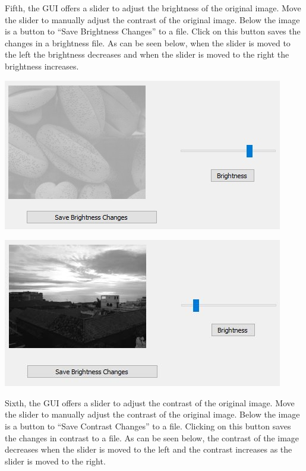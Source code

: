 \documentclass{article}
\newenvironment{Figure}
  {\par\medskip\noindent\ignorespaces\minipage{\linewidth}}
  {\endminipage\par\medskip}
\begin{document}
\begin{multicols*}{2}
Fifth, the GUI offers a slider to adjust the brightness of the original image. Move the slider to manually adjust the contrast of the original image. Below the image is a button to “Save Brightness Changes” to a file. Click on this button saves the changes in a brightness file. As can be seen below, when the slider is moved to the left the brightness decreases and when the slider is moved to the right the brightness increases.


\begin{Figure}
 \centering
 \includegraphics[width=\linewidth]{BrightnessImage.jpg}
\end{Figure}

\begin{Figure}
 \centering
 \includegraphics[width=\linewidth]{BrightnessImage2.jpg}
\end{Figure}

Sixth, the GUI offers a slider to adjust the contrast of the original image. Move the slider to manually adjust the contrast of the original image. Below the image is a button to “Save Contrast Changes” to a file. Clicking on this button saves the changes in contrast to a file. As can be seen below, the contrast of the image decreases when the slider is moved to the left and the contrast increases as the slider is moved to the right.


\end{multicols*}
\end{document}
